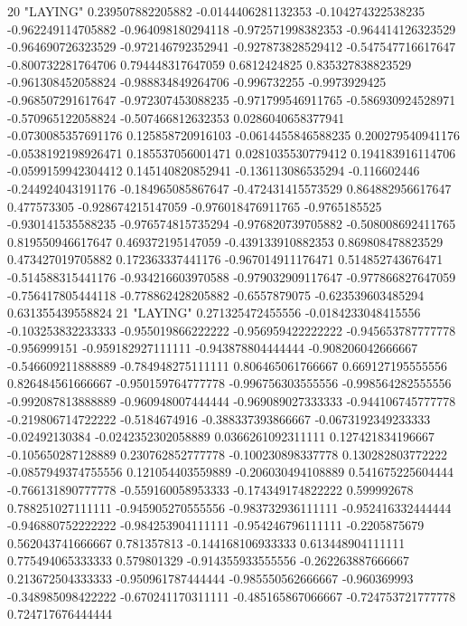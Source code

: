 20 "LAYING" 0.239507882205882 -0.0144406281132353 -0.104274322538235 -0.962249114705882 -0.964098180294118 -0.972571998382353 -0.964414126323529 -0.964690726323529 -0.972146792352941 -0.927873828529412 -0.547547716617647 -0.800732281764706 0.794448317647059 0.6812424825 0.835327838823529 -0.961308452058824 -0.988834849264706 -0.996732255 -0.9973929425 -0.968507291617647 -0.972307453088235 -0.971799546911765 -0.586930924528971 -0.570965122058824 -0.507466812632353 0.0286040658377941 -0.0730085357691176 0.125858720916103 -0.0614455846588235 0.200279540941176 -0.0538192198926471 0.185537056001471 0.0281035530779412 0.194183916114706 -0.0599159942304412 0.145140820852941 -0.136113086535294 -0.116602446 -0.244924043191176 -0.184965085867647 -0.472431415573529 0.864882956617647 0.477573305 -0.928674215147059 -0.976018476911765 -0.9765185525 -0.930141535588235 -0.976574815735294 -0.976820739705882 -0.508008692411765 0.819550946617647 0.469372195147059 -0.439133910882353 0.869808478823529 0.473427019705882 0.172363337441176 -0.967014911176471 0.514852743676471 -0.514588315441176 -0.934216603970588 -0.979032909117647 -0.977866827647059 -0.756417805444118 -0.778862428205882 -0.6557879075 -0.623539603485294 0.631355439558824
21 "LAYING" 0.271325472455556 -0.0184233048415556 -0.103253832233333 -0.955019866222222 -0.956959422222222 -0.945653787777778 -0.956999151 -0.959182927111111 -0.943878804444444 -0.908206042666667 -0.546609211888889 -0.784948275111111 0.806465061766667 0.669127195555556 0.826484561666667 -0.950159764777778 -0.996756303555556 -0.998564282555556 -0.992087813888889 -0.960948007444444 -0.969089027333333 -0.944106745777778 -0.219806714722222 -0.5184674916 -0.388337393866667 -0.0673192349233333 -0.02492130384 -0.0242352302058889 0.0366261092311111 0.127421834196667 -0.105650287128889 0.230762852777778 -0.100230898337778 0.130282803772222 -0.0857949374755556 0.121054403559889 -0.206030494108889 0.541675225604444 -0.766131890777778 -0.559160058953333 -0.174349174822222 0.599992678 0.788251027111111 -0.945905270555556 -0.983732936111111 -0.952416332444444 -0.946880752222222 -0.984253904111111 -0.954246796111111 -0.2205875679 0.562043741666667 0.781357813 -0.144168106933333 0.613448904111111 0.775494065333333 0.579801329 -0.914355933555556 -0.262263887666667 0.213672504333333 -0.950961787444444 -0.985550562666667 -0.960369993 -0.348985098422222 -0.670241170311111 -0.485165867066667 -0.724753721777778 0.724717676444444
